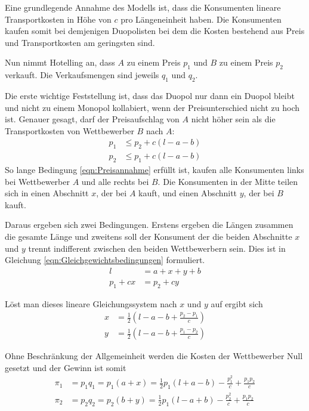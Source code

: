 Eine grundlegende Annahme des Modells ist, dass die Konsumenten lineare Transportkosten in Höhe von $c$ pro Längeneinheit haben. Die Konsumenten kaufen somit bei demjenigen Duopolisten bei dem die Kosten bestehend aus Preis und Transportkosten am geringsten sind.

Nun nimmt Hotelling an, dass $A$ zu einem Preis $p_1$ und $B$ zu einem Preis $p_2$ verkauft. Die Verkaufsmengen sind jeweils $q_1$ und $q_2$.

Die erste wichtige Feststellung ist, dass das Duopol nur dann ein Duopol bleibt und nicht zu einem Monopol kollabiert, wenn der Preisunterschied nicht zu hoch ist. Genauer gesagt, darf der Preisaufschlag von $A$ nicht höher sein als die Transportkosten von Wettbewerber $B$ nach $A$:
\begin{equation}\label{eqn:Preisannahme}
\begin{split}
p_1 &\leq p_2 + c(l-a-b) \\
p_2 &\leq p_1 + c(l-a-b)
\end{split}
\end{equation}
So lange Bedingung \ref{eqn:Preisannahme} erfüllt ist, kaufen alle Konsumenten links bei Wettbewerber $A$ und alle rechts bei $B$. Die Konsumenten in der Mitte teilen sich in einen Abschnitt $x$, der bei $A$ kauft, und einen Abschnitt $y$, der bei $B$ kauft.

Daraus ergeben sich zwei Bedingungen. Erstens ergeben die Längen zusammen die gesamte Länge und zweitens soll der Konsument der die beiden Abschnitte $x$ und $y$ trennt indifferent zwischen den beiden Wettbewerbern sein. Dies ist in Gleichung \ref{eqn:Gleichgewichtsbedingungen} formuliert.
\begin{equation}\label{eqn:Gleichgewichtsbedingungen}
\begin{split}
l &= a + x + y + b \\
p_1 + cx &= p_2 + cy
\end{split}
\end{equation}

Löst man dieses lineare Gleichungssystem nach $x$ und $y$ auf ergibt sich
\begin{equation}
\begin{split}
x &= \tfrac{1}{2} \left(l-a-b+\frac{p_2-p_1}{c}\right)\\
y &= \tfrac{1}{2} \left(l-a-b+\frac{p_1-p_2}{c}\right)
\end{split}
\end{equation}

Ohne Beschränkung der Allgemeinheit werden die Kosten der Wettbewerber Null gesetzt und der Gewinn ist somit
\begin{equation}
\begin{split}
\pi_1 &= p_1 q_1 = p_1 (a+x) = \tfrac{1}{2} p_1 \left(l+a-b\right) -\frac{p_1^2}{c}+\frac{p_1 p_2}{c}\\
\pi_2 &= p_2 q_2 = p_2 (b+y) = \tfrac{1}{2} p_1 \left(l-a+b\right) -\frac{p_2^2}{c}+\frac{p_1 p_2}{c}
\end{split}
\end{equation}

